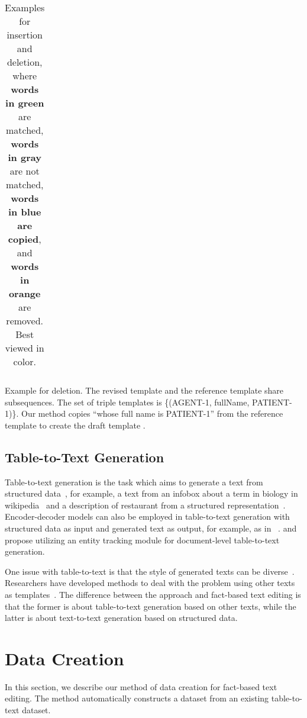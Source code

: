 \documentclass[11pt,a4paper]{article}
\newcommand{\orange}[1]{{\color[HTML]{ff7f0e}\textbf{#1}}}
\newcommand{\blue}[1]{{\color[HTML]{1f77b4}\textbf{#1}}}
\newcommand{\green}[1]{{\color[HTML]{2ca02c}\textbf{#1}}}
\newcommand{\gray}[1]{{\color[HTML]{808080}\textbf{#1}}}
\begin{document}
\begin{table*}[t]
\begin{subtable}[t]{\textwidth}
\begin{tabular*}{\textwidth}{cc@{\quad}c@{\quad}c@{\quad}c@{\quad}c@{\quad}c@{\quad}c@{\quad}c@{\quad}c@{\quad}c@{\quad}c@{\quad}c@{\quad}c@{\quad}c@{\quad}c@{\quad}c@{\quad}c@{\quad}c@{}}
        \end{tabular*}
        \caption{Example for deletion. The revised template  and the reference template  share subsequences. The set of triple templates  is \{(AGENT-1, fullName, PATIENT-1)\}. Our method copies ``whose full name is PATIENT-1'' from the reference template  to create the draft template .}
        \label{tab:delete}
    \end{subtable}
    \caption{Examples for insertion and deletion, where \green{words in green} are matched, \gray{words in gray} are not matched, \blue{words in blue are copied}, and \orange{words in orange} are removed. Best viewed in color.}
    \label{tab:edit}
\end{table*}
\subsection{Table-to-Text Generation}
Table-to-text generation is the task which aims to generate a text from structured data~\cite{reiter2000building,gatt2018survey}, for example, a text from an infobox about a term in biology in wikipedia~\cite{lebret2016neural} and a description of restaurant from a structured representation~\cite{novikova2017e2e}. Encoder-decoder models can also be employed in table-to-text generation with structured data as input and generated text as output, for example, as in ~\cite{lebret2016neural}.
\citet{puduppully2019data} and \citet{iso2019learning} propose utilizing an entity tracking module for document-level table-to-text generation.

One issue with table-to-text is that the style of generated texts can be diverse~\cite{iso2019learning}. Researchers have developed methods to deal with the problem using other texts as templates~\cite{hashimoto2018retrieve,guu2018generating,peng2019text}. The difference between the approach and fact-based text editing is that the former is about table-to-text generation based on other texts, while the latter is about text-to-text generation based on structured data.


\section{Data Creation}
\label{sec:make_data}

In this section, we describe our method of data creation for fact-based text editing. The method automatically constructs a dataset from an existing table-to-text dataset. 
\end{document}
